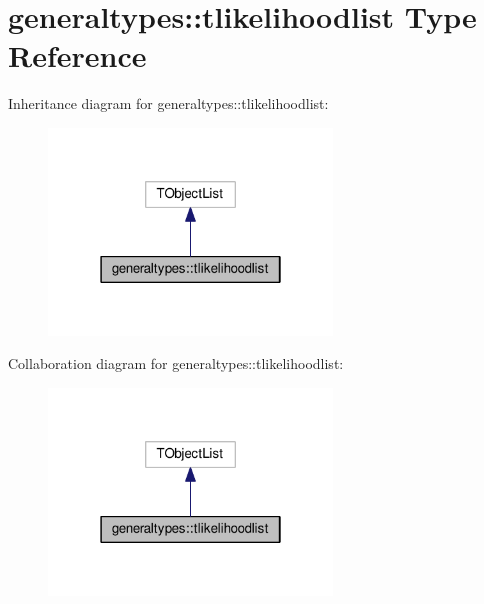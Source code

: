 \hypertarget{structgeneraltypes_1_1tlikelihoodlist}{}\section{generaltypes\+:\+:tlikelihoodlist Type Reference}
\label{structgeneraltypes_1_1tlikelihoodlist}


Inheritance diagram for generaltypes\+:\+:tlikelihoodlist\+:
\nopagebreak
\begin{figure}[H]
\begin{center}
\leavevmode
\includegraphics[width=214pt]{structgeneraltypes_1_1tlikelihoodlist__inherit__graph}
\end{center}
\end{figure}


Collaboration diagram for generaltypes\+:\+:tlikelihoodlist\+:
\nopagebreak
\begin{figure}[H]
\begin{center}
\leavevmode
\includegraphics[width=214pt]{structgeneraltypes_1_1tlikelihoodlist__coll__graph}
\end{center}
\end{figure}
